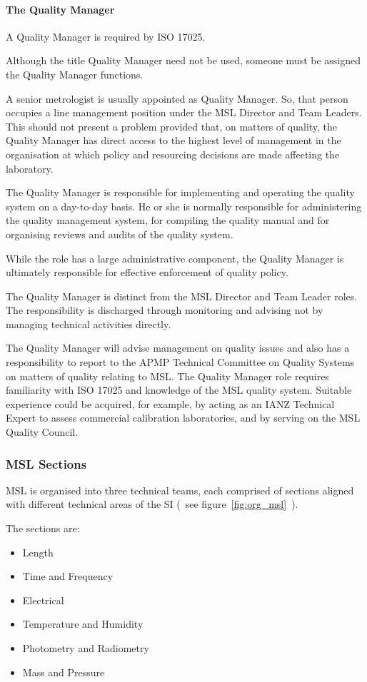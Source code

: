 \paragraph{The Quality Manager}
A Quality Manager is required by ISO 17025. 

Although the title Quality Manager need not be used, someone must be 
assigned the Quality Manager functions. 

A senior metrologist is usually appointed as Quality Manager. So, that person occupies a line management position under the MSL Director and Team Leaders. This should not present a problem provided that, on matters of quality, the Quality Manager has direct access to the highest level of management in the organisation at which policy and resourcing decisions are made affecting the 
laboratory.

The Quality Manager is responsible for implementing and operating the quality system on a day-to-day basis. He or she is normally responsible for administering the quality management system, for compiling the quality manual and for organising reviews and audits of the quality system.

While the role has a large administrative component, the Quality Manager is ultimately responsible for effective enforcement of quality policy. 

The Quality Manager is distinct from the MSL Director and Team Leader roles. The responsibility is discharged through monitoring and advising not by managing technical activities directly.

The Quality Manager will advise management on quality issues and also has a responsibility to report to the APMP Technical Committee on Quality Systems on matters of quality relating to MSL.
The Quality Manager role requires familiarity with ISO 17025 and knowledge of the MSL quality system. Suitable experience could be acquired, for example, by acting as an IANZ Technical Expert to assess commercial calibration laboratories, and by serving on the MSL Quality Council.

\subsubsection{MSL Sections}
MSL is organised into three technical teams, each comprised of sections aligned with different technical areas of the SI (~see figure~\ref{fig:org_msl}~).

The sections are: 
\begin{itemize}
\item	Length
\item	Time and Frequency 
\item	Electrical 
\item	Temperature and Humidity
\item	Photometry and Radiometry
\item	Mass and Pressure
\end{itemize}

